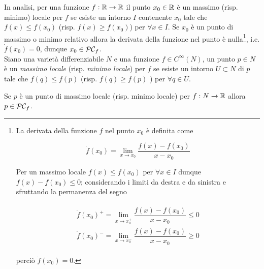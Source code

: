 In analisi, per una funzione $ f : \mathbb{R} \to \mathbb{R} $ il punto $ x_{0} \in \mathbb{R} $ è un massimo (risp. minimo) locale per $ f $ se esiste un intorno $ I $ contenente $ x_{0} $ tale che $ f(x) \leqslant f(x_{0}) $ (risp. $ f(x) \geqslant f(x_{0}) $) per $ \forall x \in I $. Se $ x_{0} $ è un punto di massimo o minimo relativo allora la derivata della funzione nel punto è nulla\footnote{%
	La derivata della funzione $ f $ nel punto $ x_{0} $ è definita come
	
	\begin{equation*}
		\dot{f}(x_{0}) = \lim_{x \to x_{0}} \dfrac{f(x) - f(x_{0})}{x - x_{0}}
	\end{equation*}

	Per un massimo locale $ f(x) \leqslant f(x_{0}) $ per $ \forall x \in I $ dunque $ f(x) - f(x_{0}) \leqslant 0 $; considerando i limiti da destra e da sinistra e sfruttando la permanenza del segno
	
	\begin{align*}
		\begin{split}
			\dot{f}(x_{0})^{+} = \lim_{x \to x_{0}^{+}} \dfrac{f(x) - f(x_{0})}{x - x_{0}} \leqslant 0\\
			\dot{f}(x_{0})^{-} = \lim_{x \to x_{0}^{-}} \dfrac{f(x) - f(x_{0})}{x - x_{0}} \geqslant 0
		\end{split}
	\end{align*}

	perciò $ \dot{f}(x_{0}) = 0 $.%
}, i.e. $ \dot{f}(x_{0}) = 0 $, dunque $ x_{0} \in \mathcal{PC}_{f} $.\\
Siano una varietà differenziabile $ N $ e una funzione $ f \in C^{\infty}(N) $, un punto $ p \in N $ è un \textit{massimo locale} (risp. \textit{minimo locale}) per $ f $ se esiste un intorno $ U \subset N $ di $ p $ tale che $ f(q) \leqslant f(p) $ (risp. $ f(q) \geqslant f(p) $ ) per $ \forall q \in U $.

\begin{definition}
	Se $ p $ è un punto di massimo locale (risp. minimo locale) per $ f : N \to \mathbb{R} $ allora $ p \in \mathcal{PC}_{f} $.
\end{definition}

